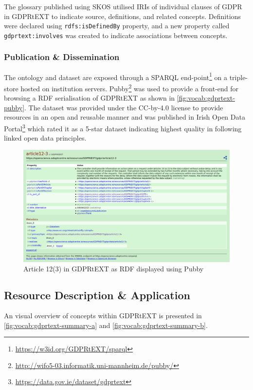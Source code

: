 The glossary published using SKOS utilised IRIs of individual clauses of GDPR in GDPRtEXT to indicate source, definitions, and related concepts. Definitions were declared using \texttt{rdfs:isDefinedBy} property, and a new property called \texttt{gdprtext:involves} was created to indicate associations between concepts. 

\subsubsection{Publication \& Dissemination}
The ontology and dataset are exposed through a SPARQL end-point\footnote{\url{https://w3id.org/GDPRtEXT/sparql}} on a triple-store hosted on institution servers. Pubby\footnote{\url{http://wifo5-03.informatik.uni-mannheim.de/pubby/}} was used to provide a front-end for browsing a RDF serialisation of GDPRtEXT as shown in \autoref{fig:vocab:gdprtext-pubby}. The dataset was provided under the CC-by-4.0 license to provide resources in an open and reusable manner and was published in Irish Open Data Portal\footnote{\url{https://data.gov.ie/dataset/gdprtext}} which rated it as a 5-star dataset indicating highest quality in following linked open data principles.
\begin{figure}[htbp]
    \centering
    \includegraphics[width=\linewidth]{img/gdprtext-pubby}
    \caption{Article 12(3) in GDPRtEXT as RDF displayed using Pubby \cite{pandit_gdprtext_2018}}
    \label{fig:vocab:gdprtext-pubby}
\end{figure}

\subsection{Resource Description \& Application}
An visual overview of concepts within GDPRtEXT is presented in \autoref{fig:vocab:gdprtext-summary-a} and \autoref{fig:vocab:gdprtext-summary-b}.


